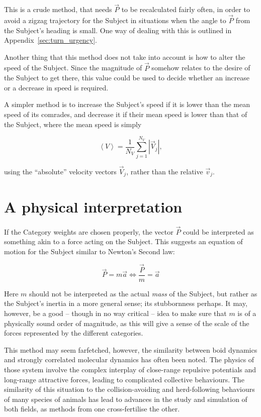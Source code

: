 \documentclass[]{article} %
\begin{document}
This is a crude method, that needs $\vec{P}$ to be recalculated fairly often, in order to avoid a zigzag trajectory for the Subject in situations when the angle to $\vec{P}$ from the Subject's heading is small.
One way of dealing with this is outlined in Appendix~\ref{sec:turn_urgency}.

Another thing that this method does not take into account is how to alter the speed of the Subject.
Since the magnitude of $\vec{P}$ somehow relates to the desire of the Subject to get there, this value could be used to decide whether an increase or a decrease in speed is required.

A simpler method is to increase the Subject's speed if it is lower than the mean speed of its comrades, and decrease it if their mean speed is lower than that of the Subject, where the mean speed is simply

\begin{equation}
 \label{eq:mean_velocity}
  \left<V\right> = \frac{1}{N_V}\sum_{j=1}^{N_V} \left|\vec{V}_j\right|,
\end{equation}

\noindent using the ``absolute'' velocity vectors $\vec{V}_j$, rather than the relative $\vec{v}_j$.


\section{A physical interpretation}
\label{sec:newton}
If the Category weights are chosen properly, the vector $\vec{P}$ could be interpreted as something akin to a force acting on the Subject.
This suggests an equation of motion for the Subject similar to Newton's Second law:~\cite{Physics}

\begin{equation}
 \label{eq:Newton2}
 \vec{P}=m\vec{a} \Leftrightarrow \frac{\vec{P}}{m} = \vec{a}
\end{equation}

\noindent Here $m$ should not be interpreted as the actual \emph{mass} of the Subject, but rather as the Subject's inertia in a more general sense; its stubbornness perhaps.
It may, however, be a good -- though in no way critical -- idea to make sure that $m$ is of a physically sound order of magnitude, as this will give a sense of the scale of the forces represented by the different categories.

This method may seem farfetched, however, the similarity between boid dynamics and strongly correlated molecular dynamics has often been noted.
The physics of those system involve the complex interplay of close-range repulsive potentials and long-range attractive forces, leading to complicated collective behaviours.
The similarity of this situation to the collision-avoiding and herd-following behaviours of many species of animals has lead to advances in the study and simulation of both fields, as methods from one cross-fertilise the other.~\cite{Eriksson2010}
\end{document}
